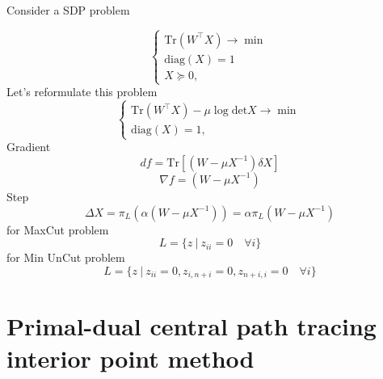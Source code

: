 \documentclass[12pt]{article}
\begin{document}
Consider a SDP problem

\begin{equation}
\label{primal}
	\begin{cases}
		\text{Tr} \left( W^{\top} X \right) \longrightarrow \min \\
		\text{diag} \left( X \right) = 1\\
		X \succeq 0,
	\end{cases}
\end{equation}
Let's reformulate this problem
\begin{equation}
\label{primal}
	\begin{cases}
		\text{Tr} \left( W^{\top} X \right) - \mu \log \text{det} X \longrightarrow \min \\
		\text{diag} \left( X \right) = 1,
	\end{cases}
\end{equation}
Gradient
\[
df = \text{Tr} \left[ (W - \mu X^{-1}) \delta X\right]
\]
\[
\nabla f = (W - \mu X^{-1})
\]
Step
\[
\Delta X = \pi_L \left( \alpha  (W - \mu X^{-1})\right) =  \alpha \pi_L \left(  W - \mu X^{-1}\right)
\]
for MaxCut problem 
\[L = \{z \ | \ z_{ii} = 0 \quad \forall i\}\]
for Min UnCut problem \[L = \{z \ | \ z_{ii} = 0, z_{i,n+i} = 0, z_{n+i, i} = 0 \quad \forall i\}\]












\section{Primal-dual central path tracing interior point method}
\end{document}
